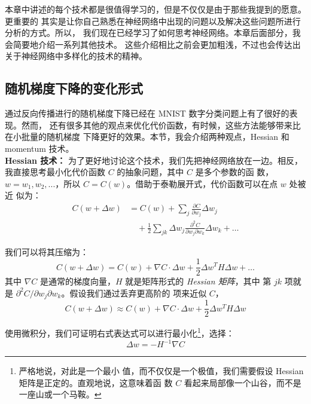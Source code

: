 本章中讲述的每个技术都是很值得学习的，但是不仅仅是由于那些我提到的愿意。更重要的
其实是让你自己熟悉在神经网络中出现的问题以及解决这些问题所进行分析的方式。所以，
我们现在已经学习了如何思考神经网络。本章后面部分，我会简要地介绍一系列其他技术。
这些介绍相比之前会更加粗浅，不过也会传达出关于神经网络中多样化的技术的精神。

\subsection{随机梯度下降的变化形式}

通过反向传播进行的随机梯度下降已经在 MNIST 数字分类问题上有了很好的表现。然而，
还有很多其他的观点来优化代价函数，有时候，这些方法能够带来比在小批量的随机梯度
下降更好的效果。本节，我会介绍两种观点，Hessian 和 momentum 技术。
\\

\textbf{Hessian 技术：} 为了更好地讨论这个技术，我们先把神经网络放在一边。相反，
我直接思考最小化代价函数 $C$ 的抽象问题，其中 $C$ 是多个参数的函
数，$w=w_1,w_2,...$，所以 $C=C(w)$。借助于泰勒展开式，代价函数可以在点 $w$ 处被近
似为：
\begin{align}
  C(w+\Delta w) &= C(w) + \sum_j \frac{\partial C}{\partial w_j} \Delta w_j \nonumber \\
     & \quad + \frac{1}{2} \sum_{jk} \Delta w_j \frac{\partial^2 C}{\partial w_j \partial w_k} \Delta w_k + \ldots \label{eq:103}\tag{103}
\end{align}

我们可以将其压缩为：
\begin{equation}
  C(w+\Delta w) = C(w) + \nabla C \cdot \Delta w +
  \frac{1}{2} \Delta w^T H \Delta w + \ldots
  \label{eq:104}\tag{104}
\end{equation}
其中 $\nabla C$ 是通常的梯度向量，$H$ 就是矩阵形式的 \emph{Hessian 矩阵}，其中
第 $jk$ 项就是 $\partial^2 C/\partial w_j\partial w_k$。假设我们通过丢弃更高阶的
项来近似 $C$，
\begin{equation} 
  C(w+\Delta w) \approx C(w) + \nabla C \cdot \Delta w +
  \frac{1}{2} \Delta w^T H \Delta w
  \label{eq:105}\tag{105}
\end{equation}

使用微积分，我们可证明右式表达式可以进行最小化\footnote{严格地说，对此是一个最小
  值，而不仅仅是一个极值，我们需要假设 Hessian 矩阵是正定的。直观地说，这意味着函
  数 $C$ 看起来局部像一个山谷，而不是一座山或一个马鞍。}，选择：
\begin{equation}
  \Delta w = -H^{-1} \nabla C
  \label{eq:106}\tag{106}
\end{equation}

